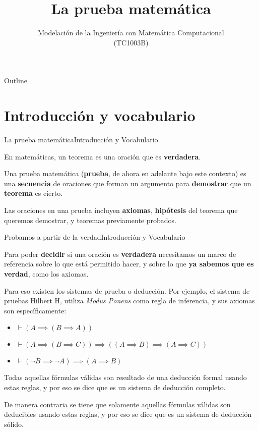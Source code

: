 \documentclass[spanish, c]{beamer}
\title{La prueba matemática}
\subtitle{Modelación de la Ingeniería con Matemática Computacional \\ (TC1003B)}
\author{
    \texorpdfstring{
        \begin{center}
            M.C. Xavier Sánchez Díaz \\
            \href{mailto:mail@tec.mx}{\texttt{mail@tec.mx}}
        \end{center}
    }
    {M.C. Xavier Sánchez Díaz}
}
\institute[Tecnológico de Monterrey]{\texttt{[image: ../../img/logo]}}
\date{}
\begin{document}
\setlength{\rightskip}{0pt}

\begin{frame}[plain]
    \titlepage        
\end{frame}

\begin{frame}{Outline}
    \tableofcontents
\end{frame}

\section{Introducción y vocabulario}

\begin{frame}{La prueba matemática}{Introducción y Vocabulario}

    En matemáticas, un \alert{teorema} es una oración que es \textbf{verdadera}. \pause

    \bigskip

    Una \alert{prueba matemática} (\textbf{prueba}, de ahora en adelante bajo este contexto) es una \textbf{secuencia} de oraciones que forman un argumento para \textbf{demostrar} que un \textbf{teorema} es cierto. \pause

    \bigskip

    Las oraciones en una prueba incluyen \textbf{axiomas}, \textbf{hipótesis} del teorema que queremos demostrar, y teoremas previamente probados.
\end{frame}

\begin{frame}{Probamos a partir de la verdad}{Introducción y Vocabulario}

    Para poder \textbf{decidir} si una oración es \textbf{verdadera} necesitamos un marco de referencia sobre lo que está permitido hacer, y sobre lo que \textbf{ya sabemos que es verdad}, como los axiomas. \pause

    \bigskip
    
    Para eso existen los \alert{sistemas de prueba o deducción}. Por ejemplo, el sistema de pruebas Hilbert $\mathrm{H}$, utiliza \textit{Modus Ponens} como regla de inferencia, y sus axiomas son específicamente:

    \begin{itemize}
        \item $\vdash (A \implies (B \implies A))$
        \item $\vdash (A \implies (B \implies C)) \implies ((A \implies B) \implies (A \implies C))$
        \item $\vdash (\neg B \implies \neg A) \implies (A \implies B)$
    \end{itemize} \pause

    \alert{Todas} aquellas fórmulas válidas son resultado de una deducción formal usando estas reglas, y por eso se dice que es un sistema de deducción \alert{completo}. \pause

    \bigskip

    De manera contraria se tiene que \alert{solamente} aquellas fórmulas válidas son deducibles usando estas reglas, y por eso se dice que es un sistema de deducción \alert{sólido}.
\end{frame}
\end{document}
